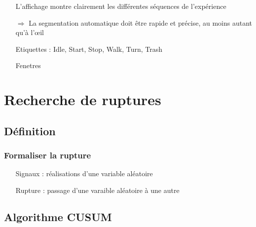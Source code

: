 \documentclass{beamer}
\begin{document}
\begin{frame}
	\frametitle{}
	\begin{itemize}
		\item[L'affichage] montre clairement les différentes séquences de l'expérience
		\item[$\Longrightarrow$] La segmentation automatique doit être rapide et précise, au moins autant qu'à l'œil
		
		\item[Etiquettes]: Idle, Start, Stop, Walk, Turn, Trash
		
		\item[Fenetres]
		
	\end{itemize}
\end{frame}

\section{Recherche de ruptures}

\subsection{Définition}

\begin{frame}

\frametitle{Formaliser la rupture}

\begin{itemize}

	\item[Signaux]: réalisations d'une variable aléatoire
	
	\item[Rupture]: passage d'une varaible aléatoire à une autre

\end{itemize}

\end{frame}

\subsection{Algorithme CUSUM}
\end{document}
